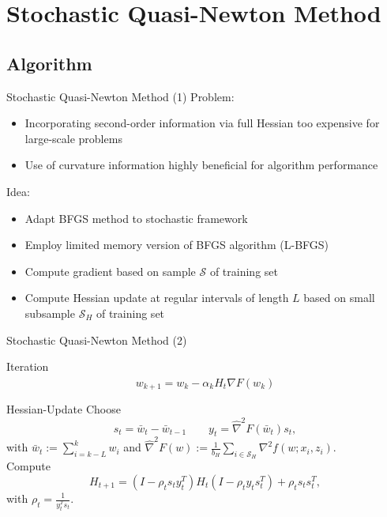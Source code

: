 \documentclass[11pt]{beamer}
\begin{document}
	\section{Stochastic Quasi-Newton Method}
	\subsection{Algorithm}
	
	\begin{frame}{Stochastic Quasi-Newton Method (1)}
		Problem:
		\begin{itemize}
			\item Incorporating second-order information via full Hessian too expensive for
			large-scale problems
			\item Use of curvature information highly beneficial for algorithm performance
		\end{itemize}
		\pause
		Idea:
		\begin{itemize}
			\item Adapt BFGS method to stochastic framework
			\item Employ limited memory version of BFGS algorithm (L-BFGS)
			\item Compute gradient based on sample $\mathcal{S}$ of training set
			\item Compute Hessian update at regular intervals of length $L$ based on small 
			subsample $\mathcal{S}_H$ of training set
		\end{itemize}
	\end{frame}
	
	\begin{frame}{Stochastic Quasi-Newton Method (2)}
		\begin{block}{Iteration}
			\vspace{-0.3 cm}
			\begin{equation*}
				w_{k+1} = w_k - \alpha_k H_t \widehat{\nabla}F(w_k)
			\end{equation*}
		\end{block}
		\begin{block}{Hessian-Update}
			Choose
			\begin{equation*}
				s_t = \bar{w}_t - \bar{w}_{t-1} \qquad y_t = \widehat{\nabla}^2 F(\bar{w}_t) s_t,
			\end{equation*}
			with $\bar{w}_t := \sum^k_{i = k-L} w_i$ and $\widehat{\nabla}^2 F(w)
			:= \frac{1}{b_H} \sum_{i \in \mathcal{S}_H} \nabla^2 f(w; x_i, z_i)$.\\
			\vspace{0.3 cm}
			Compute
			\begin{equation*}
				H_{t+1} = (I - \rho_t s_t y^T_t) H_t (I - \rho_t y_t s^T_t) + \rho_t s_t s^T_t,
			\end{equation*}
			with $\rho_t = \frac{1}{y^T_t s_t}$.
		\end{block}
	\end{frame}
	
\end{document}

